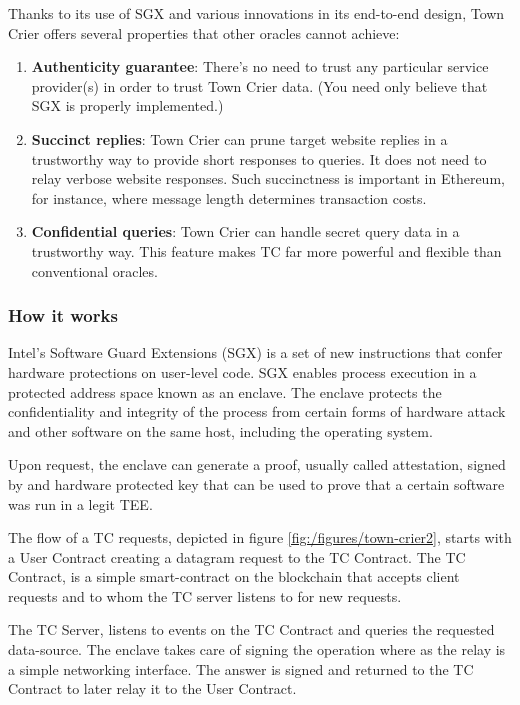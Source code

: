 Thanks to its use of SGX and various innovations in its end-to-end design, Town Crier offers several properties that other oracles cannot achieve:

\begin{enumerate}
    \item \textbf{Authenticity guarantee}: There's no need to trust any particular service provider(s) in order to trust Town Crier data. (You need only believe that SGX is properly implemented.)
    \item \textbf{Succinct replies}: Town Crier can prune target website replies in a trustworthy way to provide short responses to queries. It does not need to relay verbose website responses. Such succinctness is important in Ethereum, for instance, where message length determines transaction costs.
    \item \textbf{Confidential queries}: Town Crier can handle secret query data in a trustworthy way. This feature makes TC far more powerful and flexible than conventional oracles.
\end{enumerate}

\subsubsection{How it works}

Intel’s Software Guard Extensions (SGX) is a set of new instructions that confer hardware protections on user-level code. SGX enables process execution in a protected address space known as an enclave. The enclave protects the confidentiality and integrity of the process from certain forms of hardware attack and other software on the same host, including the operating system.

Upon request, the enclave can generate a proof, usually called attestation, signed by and hardware protected key that can be used to prove that a certain software was run in a legit TEE.

The flow of a TC requests, depicted in figure \ref{fig:/figures/town-crier2}, starts with a User Contract creating a datagram request to the TC Contract. The TC Contract, is a simple smart-contract on the blockchain that accepts client requests and to whom the TC server listens to for new requests.

The TC Server, listens to events on the TC Contract and queries the requested data-source. The enclave takes care of signing the operation where as the relay is a simple networking interface. The answer is signed and returned to the TC Contract to later relay it to the User Contract.


